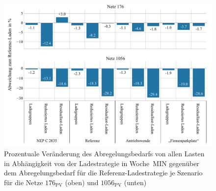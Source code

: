 \begin{figure}[H]
    \centering
    \includegraphics[width=\textwidth]{Bilder/176_1056_cur_load_grid_week_A}
    \caption[Prozentuale Veränderung des Abregelungsbedarfs von allen Lasten in Abhängigkeit von der Ladestrategie in Woche~MIN gegenüber dem Abregelungsbedarf für die Referenz-Ladestrategie je Szenario für die Netze \num{176} und \num{1056}]{Prozentuale Veränderung des Abregelungsbedarfs von allen Lasten in Abhängigkeit von der Ladestrategie in Woche~MIN gegenüber dem Abregelungsbedarf für die Referenz-Ladestrategie je Szenario für die Netze \(176_{\text{PV}}\) (oben) und \(1056_{\text{PV}}\) (unten)}\label{fig:176_1056_cur_load_grid_week_A}
\end{figure}